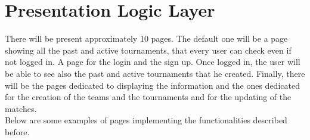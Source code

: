 \section{Presentation Logic Layer}

There will be present approximately 10 pages. The default one will be a page showing all the past and active tournaments, that every user can check even if not logged in. A page for the login and the sign up. Once logged in, the user will be able to see also the past and active tournaments that he created. Finally, there will be the pages dedicated to displaying the information and the ones dedicated for the creation of the teams and the tournaments and for the updating of the matches.\\
Below are some examples of pages implementing the functionalities described before.

